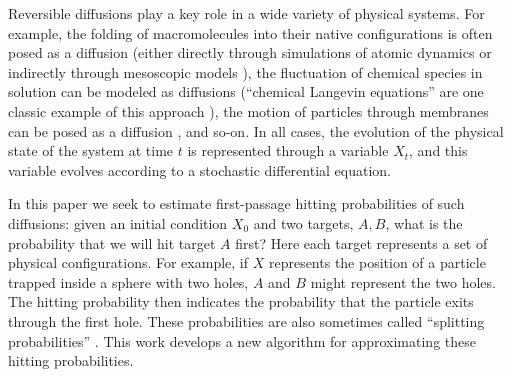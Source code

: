 \documentclass[12pt, nofootinbib,english, amsmath, amssymb, aps, priprint, graphicx,floatfix]{revtex4-1}
\theoremstyle{plain}
\theoremstyle{definition}
\theoremstyle{plain}
\begin{document}
Reversible diffusions play a key role in a wide variety of physical systems.  For example, the folding of macromolecules into their native configurations is often posed as a diffusion (either directly through simulations of atomic dynamics or indirectly through mesoscopic models \cite{Scheraga2007-qw,Hospital2015-ol,lei2010direct}), the fluctuation of chemical species in solution can be modeled as diffusions (``chemical Langevin equations'' are one classic example of this approach \cite{sotiropoulos2011analytical,gillespie2000chemical}), the motion of particles through membranes can be posed as a diffusion \cite{holcman2004escape}, and so-on.   In all cases, the evolution of the physical state of the system at time $t$ is represented through a variable $X_t$, and this variable evolves according to a stochastic differential equation. 

In this paper we seek to estimate first-passage hitting probabilities of such diffusions: given an initial condition $X_0$ and two targets, $A,B$, what is the probability that we will hit target $A$ first?   Here each target represents a set of physical configurations.  For example, if $X$ represents the position of a particle trapped inside a sphere with two holes, $A$ and $B$ might represent the two holes.  The hitting probability then indicates the probability that the particle exits through the first hole.  These probabilities are also sometimes called ``splitting probabilities'' \cite{E2006-fm}.  This work develops a new algorithm for approximating these hitting probabilities.
\end{document}
